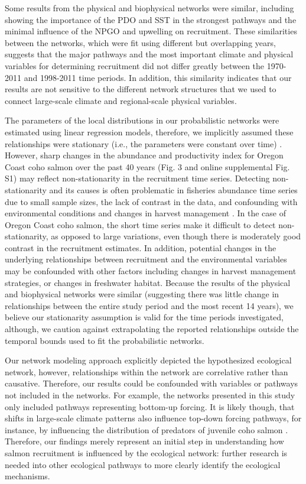 Some results from the physical and biophysical networks were similar, including
showing the importance of the PDO and SST in the strongest pathways and the
minimal influence of the NPGO and upwelling on recruitment. These similarities
between the networks, which were fit using different but overlapping years,
suggests that the major pathways and the most important climate and physical
variables for determining recruitment did not differ greatly between the
1970-2011 and 1998-2011 time periods. In addition, this similarity indicates
that our results are not sensitive to the different network structures that we
used to connect large-scale climate and regional-scale physical variables.

The parameters of the local distributions in our probabilistic networks were
estimated using linear regression models, therefore, we implicitly assumed these
relationships were stationary (i.e., the parameters were constant over time)
\citep{Walters1987a}. However, sharp changes in the abundance and productivity
index for Oregon Coast coho salmon over the past 40 years (Fig. 3 and online
supplemental Fig. S1) may reflect non-stationarity in the recruitment time
series. Detecting non-stationarity and its causes is often problematic in
fisheries abundance time series due to small sample sizes, the lack of contrast
in the data, and confounding with environmental conditions and changes in
harvest management \citep{Walters1987a, Peterman2009a}. In the case of Oregon
Coast coho salmon, the short time series make it difficult to detect
non-stationarity, as opposed to large variations, even though there is
moderately good contrast in the recruitment estimates. In addition, potential
changes in the underlying relationships between recruitment and the
environmental variables may be confounded with other factors including changes
in harvest management strategies, or changes in freshwater habitat. Because the
results of the physical and biophysical networks were similar (suggesting there
was little change in relationships between the entire study period and the most
recent 14 years), we believe our stationarity assumption is valid for the time
periods investigated, although, we caution against extrapolating the reported
relationships outside the temporal bounds used to fit the probabilistic
networks.

Our network modeling approach explicitly depicted the hypothesized ecological
network, however, relationships within the network are correlative rather than
causative. Therefore, our results could be confounded with variables or pathways
not included in the networks. For example, the networks presented in this study
only included pathways representing bottom-up forcing. It is likely though, that
shifts in large-scale climate patterns also influence top-down forcing pathways,
for instance, by influencing the distribution of predators of juvenile coho
salmon \citep{Pearcy2002a, Perry2005a}. Therefore, our findings merely represent
an initial step in understanding how salmon recruitment is influenced by the
ecological network: further research is needed into other ecological pathways to
more clearly identify the ecological mechanisms.

